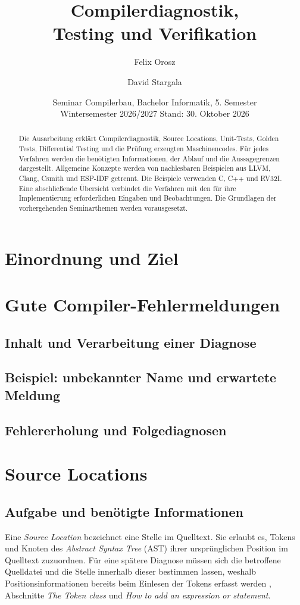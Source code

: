 \documentclass[11pt,a4paper]{article}
\title{\vspace*{-10mm}Compilerdiagnostik,\\Testing und Verifikation\\}
\author{Felix Orosz \and David Stargala}
\date{Seminar Compilerbau, Bachelor Informatik, 5. Semester\\
  Wintersemester 2026/2027 \quad Stand: 30. Oktober 2026}
\begin{document}
\renewcommand{\labelenumi}{\arabic{enumi})}
\maketitle
\thispagestyle{firstpage}
\begin{abstract}
Die Ausarbeitung erklärt Compilerdiagnostik, Source Locations, Unit-Tests, Golden Tests, Differential Testing und die Prüfung erzeugten Maschinencodes. Für jedes Verfahren werden die benötigten Informationen, der Ablauf und die Aussagegrenzen dargestellt. Allgemeine Konzepte werden von nachlesbaren Beispielen aus LLVM, Clang, Csmith und ESP-IDF getrennt. Die Beispiele verwenden C, C++ und RV32I. Eine abschlie\ss{}ende Übersicht verbindet die Verfahren mit den für ihre Implementierung erforderlichen Eingaben und Beobachtungen. Die Grundlagen der vorhergehenden Seminarthemen werden vorausgesetzt.
\end{abstract}

\setcounter{tocdepth}{1}
\tableofcontents
\newpage
\section{Einordnung und Ziel}

\section{Gute Compiler-Fehlermeldungen}
\subsection{Inhalt und Verarbeitung einer Diagnose}

\subsection{Beispiel: unbekannter Name und erwartete Meldung}

\subsection{Fehlererholung und Folgediagnosen}

\section{Source Locations}
\subsection{Aufgabe und benötigte Informationen}
Eine \emph{Source Location} bezeichnet eine Stelle im Quelltext. Sie erlaubt es, Tokens und Knoten des \emph{Abstract Syntax Tree} (AST) ihrer ursprünglichen Position im Quelltext zuzuordnen. Für eine spätere Diagnose müssen sich die betroffene Quelldatei und die Stelle innerhalb dieser bestimmen lassen, weshalb Positionsinformationen bereits beim Einlesen der Tokens erfasst werden \cite{clang}, Abschnitte \emph{The Token class} und \emph{How to add an expression or statement}.
\end{document}
